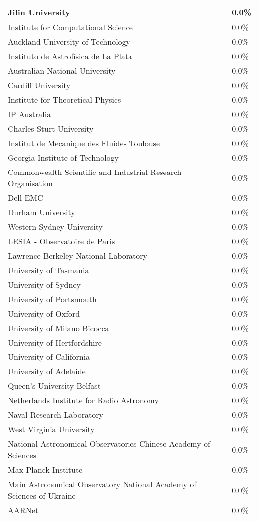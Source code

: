 \documentclass{article}%
\begin{document}
\begin{longtabu}{X[l] X[r]}
\hline%
Jilin University&0.0\%\\%
\hline%
Institute for Computational Science&0.0\%\\%
\hline%
Auckland University of Technology&0.0\%\\%
\hline%
Instituto de Astrofísica de La Plata&0.0\%\\%
\hline%
Australian National University&0.0\%\\%
\hline%
Cardiff University&0.0\%\\%
\hline%
Institute for Theoretical Physics&0.0\%\\%
\hline%
IP Australia&0.0\%\\%
\hline%
Charles Sturt University&0.0\%\\%
\hline%
Institut de Mecanique des Fluides Toulouse&0.0\%\\%
\hline%
Georgia Institute of Technology&0.0\%\\%
\hline%
Commonwealth Scientific and Industrial Research Organisation&0.0\%\\%
\hline%
Dell EMC&0.0\%\\%
\hline%
Durham University&0.0\%\\%
\hline%
Western Sydney University&0.0\%\\%
\hline%
LESIA {-} Observatoire de Paris&0.0\%\\%
\hline%
Lawrence Berkeley National Laboratory&0.0\%\\%
\hline%
University of Tasmania&0.0\%\\%
\hline%
University of Sydney&0.0\%\\%
\hline%
University of Portsmouth&0.0\%\\%
\hline%
University of Oxford&0.0\%\\%
\hline%
University of Milano Bicocca&0.0\%\\%
\hline%
University of Hertfordshire&0.0\%\\%
\hline%
University of California&0.0\%\\%
\hline%
University of Adelaide&0.0\%\\%
\hline%
Queen's University Belfast&0.0\%\\%
\hline%
Netherlands Institute for Radio Astronomy&0.0\%\\%
\hline%
Naval Research Laboratory&0.0\%\\%
\hline%
West Virginia University&0.0\%\\%
\hline%
National Astronomical Observatories Chinese Academy of Sciences&0.0\%\\%
\hline%
Max Planck Institute&0.0\%\\%
\hline%
Main Astronomical Observatory National Academy of Sciences of Ukraine&0.0\%\\%
\hline%
AARNet&0.0\%\\%
\hline%
\end{longtabu}%
\end{document}
